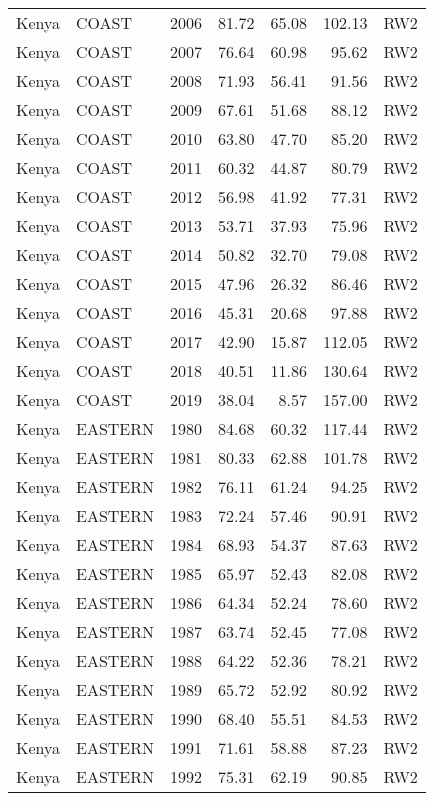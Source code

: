 \begin{longtable}{lllrrrl}
  Kenya & COAST & 2006 & 81.72 & 65.08 & 102.13 & RW2 \\ 
  Kenya & COAST & 2007 & 76.64 & 60.98 & 95.62 & RW2 \\ 
  Kenya & COAST & 2008 & 71.93 & 56.41 & 91.56 & RW2 \\ 
  Kenya & COAST & 2009 & 67.61 & 51.68 & 88.12 & RW2 \\ 
  Kenya & COAST & 2010 & 63.80 & 47.70 & 85.20 & RW2 \\ 
  Kenya & COAST & 2011 & 60.32 & 44.87 & 80.79 & RW2 \\ 
  Kenya & COAST & 2012 & 56.98 & 41.92 & 77.31 & RW2 \\ 
  Kenya & COAST & 2013 & 53.71 & 37.93 & 75.96 & RW2 \\ 
  Kenya & COAST & 2014 & 50.82 & 32.70 & 79.08 & RW2 \\ 
  Kenya & COAST & 2015 & 47.96 & 26.32 & 86.46 & RW2 \\ 
  Kenya & COAST & 2016 & 45.31 & 20.68 & 97.88 & RW2 \\ 
  Kenya & COAST & 2017 & 42.90 & 15.87 & 112.05 & RW2 \\ 
  Kenya & COAST & 2018 & 40.51 & 11.86 & 130.64 & RW2 \\ 
  Kenya & COAST & 2019 & 38.04 & 8.57 & 157.00 & RW2 \\ 
  Kenya & EASTERN & 1980 & 84.68 & 60.32 & 117.44 & RW2 \\ 
  Kenya & EASTERN & 1981 & 80.33 & 62.88 & 101.78 & RW2 \\ 
  Kenya & EASTERN & 1982 & 76.11 & 61.24 & 94.25 & RW2 \\ 
  Kenya & EASTERN & 1983 & 72.24 & 57.46 & 90.91 & RW2 \\ 
  Kenya & EASTERN & 1984 & 68.93 & 54.37 & 87.63 & RW2 \\ 
  Kenya & EASTERN & 1985 & 65.97 & 52.43 & 82.08 & RW2 \\ 
  Kenya & EASTERN & 1986 & 64.34 & 52.24 & 78.60 & RW2 \\ 
  Kenya & EASTERN & 1987 & 63.74 & 52.45 & 77.08 & RW2 \\ 
  Kenya & EASTERN & 1988 & 64.22 & 52.36 & 78.21 & RW2 \\ 
  Kenya & EASTERN & 1989 & 65.72 & 52.92 & 80.92 & RW2 \\ 
  Kenya & EASTERN & 1990 & 68.40 & 55.51 & 84.53 & RW2 \\ 
  Kenya & EASTERN & 1991 & 71.61 & 58.88 & 87.23 & RW2 \\ 
  Kenya & EASTERN & 1992 & 75.31 & 62.19 & 90.85 & RW2 \\ 

\end{longtable}
